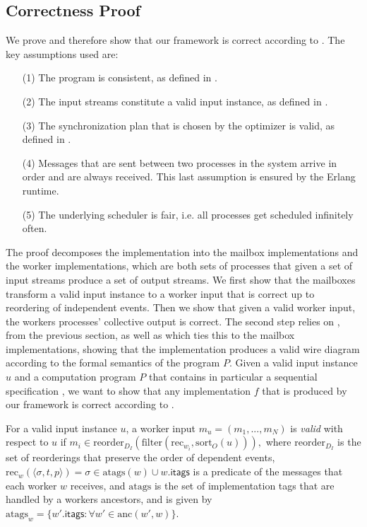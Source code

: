 \subsection{Correctness Proof}
\label{dgs:appendix:correctness}

We prove  and therefore show that our framework is correct according to .
The key assumptions used are:
\begin{enumerate}
\item[(1)] The program is consistent, as defined in .
\item[(2)] The input streams constitute a valid input instance, as defined in .
\item[(3)] The synchronization plan that is chosen by the optimizer is valid, as defined in .
\item[(4)] Messages that are sent between two processes in the system arrive in order and are always received. This last assumption is ensured by the Erlang runtime.
\item[(5)] The underlying scheduler is fair, i.e. all processes get scheduled infinitely often.
\end{enumerate}

The proof decomposes the implementation into the mailbox
implementations and the worker implementations, which are both sets of
processes that given a set of input streams produce a set of output
streams. We first show that the mailboxes transform a valid input
instance to a worker input that is correct up to reordering of
independent events. Then we show that given a valid worker input, the
workers processes' collective output is correct.
The second step relies on
,
from the previous section, as well as
which ties this to the mailbox implementations,
showing that the implementation produces a valid wire diagram according to the formal semantics of the program $P$.
Given a valid input instance $u$ and a computation program $P$ that contains
in particular a sequential specification ,
we want to show that any implementation $f$ that is produced by our framework is correct according to .

\begin{definition}
For a valid input instance $u$, a worker input $m_u = (m_1, ..., m_N)$
is \emph{valid} with respect to $u$ if $m_i \in \mathrm{reorder}_{D_I}
(\mathrm{filter}(\mathrm{rec}_{w_i}, \mathrm{sort}_O(u))),$ where
$\mathrm{reorder}_{D_I}$ is the set of reorderings that preserve the
order of dependent events,
  $\mathrm{rec}_w(\langle \sigma, t, p\rangle) = \sigma \in \mathrm{atags}(w) \cup w.\mathsf{itags}$
  is a predicate of the messages that each worker $w$ receives,
  and $\mathrm{atags}$ is the set of implementation tags that are handled by a workers ancestors, and is given by $\mathrm{atags}_w = \{ {w'}.\mathsf{itags} : \forall w' \in \mathrm{anc}(w', w)\}$.
\end{definition}

